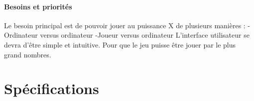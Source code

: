 \documentclass[a4paper,oneside]{article}
\begin{document}
\paragraph{Besoins et priorités\\}
Le besoin principal est de pouvoir jouer au puissance X de plusieurs manières :
	-Ordinateur versus ordinateur
	-Joueur versus ordinateur
L'interface utilisateur se devra d'être simple et intuitive.
Pour que le jeu puisse être jouer par le plus grand nombres.



\newpage

\section{Spécifications}
\end{document}
